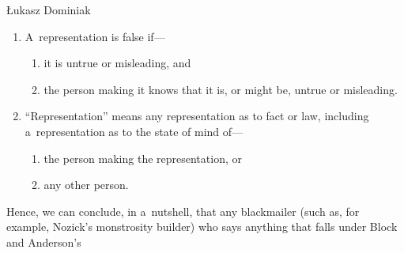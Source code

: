 \begin{artengenv}{Łukasz Dominiak}
{\begin{enumerate}
\begin{enumerate}
\begin{enumerate}
\end{enumerate}
\end{enumerate}
\item A~representation is false if---
\begin{enumerate}
\item it is untrue or misleading, and
\item the person making it knows that it is, or might be, untrue or misleading.
\end{enumerate}
\item ``Representation'' means any representation as to fact or law, including a~representation as to the state of mind of---
\begin{enumerate}
\item the person making the representation, or
\item any other person.
\end{enumerate}
\end{enumerate}
} Hence, we can conclude, in a~nutshell, that any blackmailer (such as, for example, Nozick's monstrosity builder) who says anything that falls under Block and Anderson's 
\parencite*[][p.546]{block_blackmail_2000} %

\end{artengenv}
